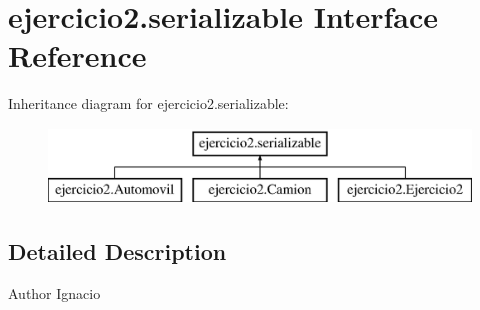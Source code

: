\hypertarget{interfaceejercicio2_1_1serializable}{}\section{ejercicio2.\+serializable Interface Reference}
\label{interfaceejercicio2_1_1serializable}
Inheritance diagram for ejercicio2.\+serializable\+:\begin{figure}[H]
\begin{center}
\leavevmode
\includegraphics[height=2.000000cm]{interfaceejercicio2_1_1serializable}
\end{center}
\end{figure}


\subsection{Detailed Description}
\begin{DoxyAuthor}{Author}
Ignacio 
\end{DoxyAuthor}
